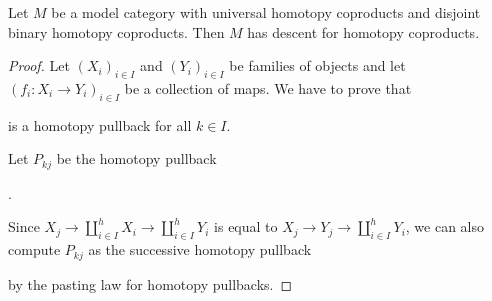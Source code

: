 \begin{corollary}\label{cor:disjointImpliesDescent}
    Let $M$ be a model category with universal homotopy coproducts and disjoint binary homotopy coproducts.
    Then $M$ has descent for homotopy coproducts.
    \begin{proof}
        Let $\left(X_i\right)_{i\in I}$ and $\left(Y_i\right)_{i\in I}$ be families of objects and let $\left(f_i\colon X_i\to Y_i\right)_{i\in I}$ be a collection of maps.
        We have to prove that 
        \begin{center}
        \end{center}
        is a homotopy pullback for all $k\in I$.
        
        Let $P_{kj}$ be the homotopy pullback
        \begin{center}
            \;.
        \end{center}
        Since $X_j\to\coprod\limits_{i\in I}^hX_i\to\coprod\limits_{i\in I}^hY_i$ is equal to $X_j\to Y_j\to\coprod\limits_{i\in I}^hY_i$, we can also compute $P_{kj}$ as the successive homotopy pullback
        \begin{center}
        \end{center}
        by the pasting law for homotopy pullbacks.


\end{proof}
\end{corollary}
